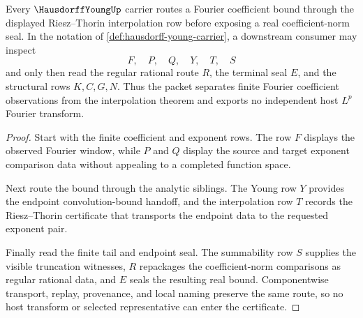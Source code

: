 \begin{theorem}
\label{thm:hausdorff-young-riesz-thorin-route}
Every $\HausdorffYoungUp$ carrier routes a Fourier coefficient bound through the displayed Riesz--Thorin interpolation row before exposing a real coefficient-norm seal. In the notation of \autoref{def:hausdorff-young-carrier}, a downstream consumer may inspect
$$
F,\quad P,\quad Q,\quad Y,\quad T,\quad S
$$
and only then read the regular rational route $R$, the terminal seal $E$, and the structural rows $K,C,G,N$. Thus the packet separates finite Fourier coefficient observations from the interpolation theorem and exports no independent host $L^p$ Fourier transform.
\end{theorem}
\begin{proof}
Start with the finite coefficient and exponent rows. The row $F$ displays the observed Fourier window, while $P$ and $Q$ display the source and target exponent comparison data without appealing to a completed function space.

Next route the bound through the analytic siblings. The Young row $Y$ provides the endpoint convolution-bound handoff, and the interpolation row $T$ records the Riesz--Thorin certificate that transports the endpoint data to the requested exponent pair.

Finally read the finite tail and endpoint seal. The summability row $S$ supplies the visible truncation witnesses, $R$ repackages the coefficient-norm comparisons as regular rational data, and $E$ seals the resulting real bound. Componentwise transport, replay, provenance, and local naming preserve the same route, so no host transform or selected representative can enter the certificate.
\end{proof}



